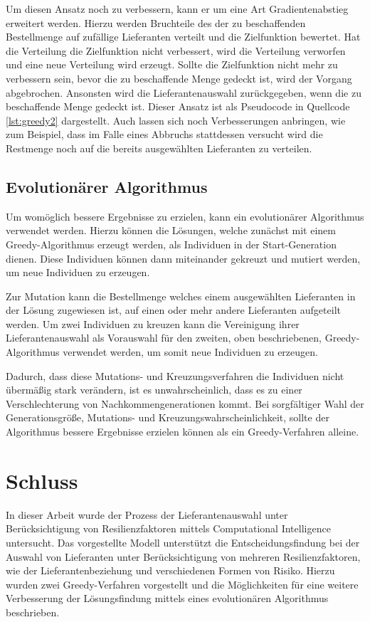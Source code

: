 Um diesen Ansatz noch zu verbessern, kann er um eine Art Gradientenabstieg erweitert werden.
Hierzu werden Bruchteile des der zu beschaffenden Bestellmenge auf zufällige Lieferanten verteilt und die Zielfunktion bewertet.
Hat die Verteilung die Zielfunktion nicht verbessert, wird die Verteilung verworfen und eine neue Verteilung wird erzeugt.
Sollte die Zielfunktion nicht mehr zu verbessern sein, bevor die zu beschaffende Menge gedeckt ist, wird der Vorgang abgebrochen.
Ansonsten wird die Lieferantenauswahl zurückgegeben, wenn die zu beschaffende Menge gedeckt ist.
Dieser Ansatz ist als Pseudocode in Quellcode \ref{lst:greedy2} dargestellt.
Auch lassen sich noch Verbesserungen anbringen, wie zum Beispiel, dass im Falle eines Abbruchs stattdessen versucht wird die Restmenge noch auf die bereits ausgewählten Lieferanten zu verteilen.

\subsection{Evolutionärer Algorithmus}\label{subsec:ea}

Um womöglich bessere Ergebnisse zu erzielen, kann ein evolutionärer Algorithmus verwendet werden.
Hierzu können die Lösungen, welche zunächst mit einem Greedy-Algorithmus erzeugt werden, als Individuen in der Start-Generation dienen.
Diese Individuen können dann miteinander gekreuzt und mutiert werden, um neue Individuen zu erzeugen.

Zur Mutation kann die Bestellmenge welches einem ausgewählten Lieferanten in der Lösung zugewiesen ist, auf einen oder mehr andere Lieferanten aufgeteilt werden.
Um zwei Individuen zu kreuzen kann die Vereinigung ihrer Lieferantenauswahl als Vorauswahl für den zweiten, oben beschriebenen, Greedy-Algorithmus verwendet werden, um somit neue Individuen zu erzeugen.

Dadurch, dass diese Mutations- und Kreuzungsverfahren die Individuen nicht übermäßig stark verändern, ist es unwahrscheinlich, dass es zu einer Verschlechterung von Nachkommengenerationen kommt.
Bei sorgfältiger Wahl der Generationsgröße, Mutations- und Kreuzungswahrscheinlichkeit, sollte der Algorithmus bessere Ergebnisse erzielen können als ein Greedy-Verfahren alleine.

\section{Schluss}\label{sec:conclusion}

In dieser Arbeit wurde der Prozess der Lieferantenauswahl unter Berücksichtigung von Resilienzfaktoren mittels Computational Intelligence untersucht.
Das vorgestellte Modell unterstützt die Entscheidungsfindung bei der Auswahl von Lieferanten unter Berücksichtigung von mehreren Resilienzfaktoren, wie der Lieferantenbeziehung und verschiedenen Formen von Risiko.
Hierzu wurden zwei Greedy-Verfahren vorgestellt und die Möglichkeiten für eine weitere Verbesserung der Lösungsfindung mittels eines evolutionären Algorithmus beschrieben.

